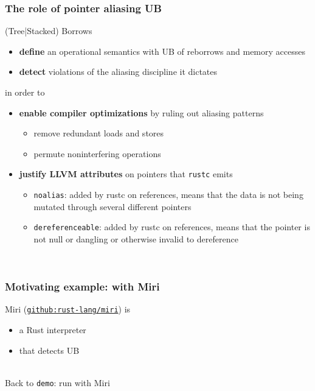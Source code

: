 \begin{frame}
    \frametitle{The role of pointer aliasing UB}
    (Tree|Stacked) Borrows
    \begin{itemize}
        \item \textbf{define} an operational semantics with UB of reborrows and memory accesses
        \item \textbf{detect} violations of the aliasing discipline it dictates
    \end{itemize}
    in order to
    \begin{itemize}
        \item \textbf{enable compiler optimizations} by ruling out aliasing patterns
            \begin{itemize}
                \item remove redundant loads and stores
                \item permute noninterfering operations
            \end{itemize}
        \item \textbf{justify LLVM attributes} on pointers that \texttt{rustc} emits
            \begin{itemize}
                \item \texttt{noalias}: added by rustc on references, means that the data
                    is not being mutated through several different pointers
                \item \texttt{dereferenceable}: added by rustc on references, means that
                    the pointer is not null or dangling or otherwise invalid to dereference
            \end{itemize}
    \end{itemize}~\\
\end{frame}

\begin{frame}[fragile]
    \frametitle{Motivating example: with Miri}
    Miri (\href{https://github.com/rust-lang/miri}{\texttt{github:rust-lang/miri}}) is
    \begin{itemize}
        \item a Rust interpreter
        \item that detects UB
    \end{itemize}~\\

    Back to \texttt{demo}: run with Miri
\end{frame}

